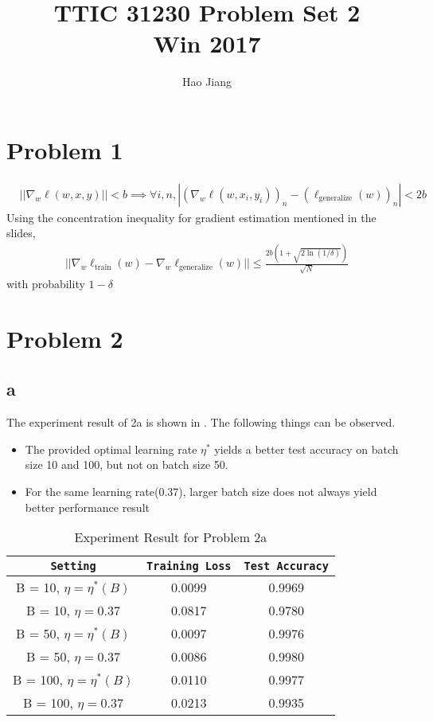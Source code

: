 \documentclass{article}
\title{TTIC 31230 Problem Set 2 \\ Win 2017}
\author{Hao Jiang}
\begin{document}
\maketitle

\section*{Problem 1}
\begin{align*}
&||\nabla_w\ell(w,x,y)|| < b
\implies \forall i,n, |(\nabla_w \ell(w,x_i,y_i))_n -
(\ell_{\text{generalize}}(w))_n| < 2b
\end{align*}
Using the concentration inequality for gradient estimation mentioned in the
slides,
\begin{align*}
||\nabla_w\ell_{\text{train}}(w) - \nabla_w \ell_{\text{generalize}}(w)|| \leq
\frac{2b\left(1+\sqrt{2\ln(1/\delta)}\right)}{\sqrt{N}}
\end{align*}
with probability $1-\delta$
\section*{Problem 2}
\subsection*{a}
The experiment result of 2a is shown in . The following things can be
observed.
\begin{itemize}
  \item The provided optimal learning rate $\eta^*$ yields a better test 
  accuracy on batch size 10 and 100, but not on batch size 50.
  \item For the same learning rate(0.37), larger batch size does not always yield
  better performance result
\end{itemize}

\begin{table}
\centering
\begin{tabular}{c|c|c}
\texttt{Setting} & \texttt{Training Loss} & \texttt{Test Accuracy} \\
\hline
B = 10, $\eta = \eta^*(B)$ & 0.0099 & 0.9969 \\
\hline
B = 10, $\eta = 0.37$ & 0.0817 & 0.9780\\
\hline
B = 50, $\eta = \eta^*(B)$ & 0.0097 & 0.9976 \\
\hline
B = 50, $\eta = 0.37$ & 0.0086 & 0.9980 \\
\hline
B = 100, $\eta = \eta^*(B)$ & 0.0110& 0.9977\\
\hline
B = 100, $\eta = 0.37$ & 0.0213 & 0.9935\\
\end{tabular}
\caption{Experiment Result for Problem 2a}
\label{tab:2a}
\end{table}
\end{document}
